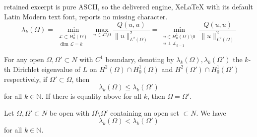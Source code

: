 \documentclass[10pt,a4paper]{amsart}
\newcommand{\norm}[1]{\lVert #1 \rVert}         %
\begin{document}
retained excerpt is pure ASCII, so the delivered engine, XeLaTeX with its default Latin Modern text font, reports no missing character.
\begin{equation}\label{eq:minmax}
    \lambda_k(\Omega) = \min_{\substack{\mathcal{L}\subset H^1_0(\Omega)\\\dim \mathcal{L}=k}} \max_{u\in \mathcal{L}\setminus 0} \frac{Q(u,u)}{\norm{u}_{L^2(\Omega)}^2} = \min_{\substack{u\in H^1_0(\Omega)\setminus 0\\ u\perp \mathcal{L}_{k-1}}}\frac{Q(u,u)}{\norm{u}_{L^2(\Omega)}^2}
\end{equation}

\begin{Lemma}\label{lem:evmon}
    For any open $\Omega, \Omega' \subset N$ with $C^1$ boundary, denoting by $\lambda_k(\Omega),\lambda_k(\Omega')$ the $k$-th Dirichlet eigenvalue of $L$ on $H^2(\Omega)\cap H^1_0(\Omega)$ and $H^2(\Omega')\cap H^1_0(\Omega')$ respectively, if $\Omega'\subset \Omega$, then
    \[
        \lambda_k(\Omega)\leq \lambda_k(\Omega')
    \]
    for all $k\in \mathbb{N}$. If there is equality above for all $k$, then $\Omega = \Omega'$.
\end{Lemma}

\begin{Proposition}\label{prop:evstrict}
    Let $\Omega,\Omega'\subset N$ be open with $\Omega\setminus \Omega'$ containing an open set $\subset N$. We have
    \[
        \lambda_k(\Omega) < \lambda_k(\Omega')
    \]
    for all $k\in\mathbb{N}$.
\end{Proposition}
\end{document}
